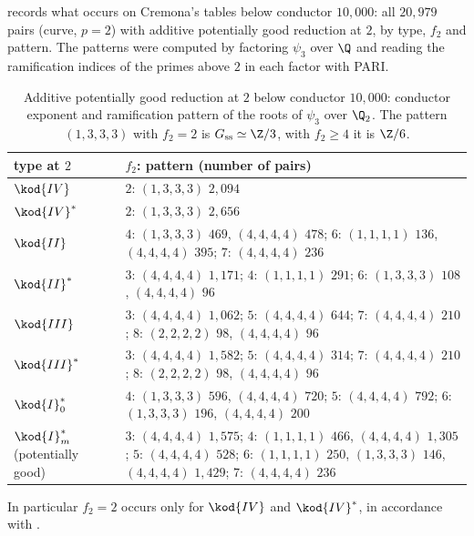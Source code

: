  records what occurs on Cremona's tables below conductor $10{,}000$: all $20{,}979$ pairs (curve, $p=2$)
with additive potentially good reduction at $2$, by type, $f_2$ and pattern. The patterns were computed by factoring $\psi_3$ over
$\Q$ and reading the ramification indices of the primes above $2$ in each factor with PARI.

\begin{table}[ht]
\centering\small
\begin{tabular}{lp{11cm}}
\toprule
type at $2$ & $f_2$: pattern (number of pairs)\\
\midrule
$\kod{IV}$ & $2$: $(1,3,3,3)$ $2{,}094$\\
$\kod{IV}^*$ & $2$: $(1,3,3,3)$ $2{,}656$\\
$\kod{II}$ & $4$: $(1,3,3,3)$ $469$, $(4,4,4,4)$ $478$; $6$: $(1,1,1,1)$ $136$, $(4,4,4,4)$ $395$; $7$: $(4,4,4,4)$ $236$\\
$\kod{II}^*$ & $3$: $(4,4,4,4)$ $1{,}171$; $4$: $(1,1,1,1)$ $291$; $6$: $(1,3,3,3)$ $108$, $(4,4,4,4)$ $96$\\
$\kod{III}$ & $3$: $(4,4,4,4)$ $1{,}062$; $5$: $(4,4,4,4)$ $644$; $7$: $(4,4,4,4)$ $210$; $8$: $(2,2,2,2)$ $98$, $(4,4,4,4)$ $96$\\
$\kod{III}^*$ & $3$: $(4,4,4,4)$ $1{,}582$; $5$: $(4,4,4,4)$ $314$; $7$: $(4,4,4,4)$ $210$; $8$: $(2,2,2,2)$ $98$, $(4,4,4,4)$ $96$\\
$\kod{I}_0^*$ & $4$: $(1,3,3,3)$ $596$, $(4,4,4,4)$ $720$; $5$: $(4,4,4,4)$ $792$; $6$: $(1,3,3,3)$ $196$, $(4,4,4,4)$ $200$\\
$\kod{I}_m^*$ (potentially good) & $3$: $(4,4,4,4)$ $1{,}575$; $4$: $(1,1,1,1)$ $466$, $(4,4,4,4)$ $1{,}305$; $5$: $(4,4,4,4)$ $528$; $6$: $(1,1,1,1)$ $250$,
$(1,3,3,3)$ $146$, $(4,4,4,4)$ $1{,}429$; $7$: $(4,4,4,4)$ $236$\\
\bottomrule
\end{tabular}
\caption{Additive potentially good reduction at $2$ below conductor $10{,}000$: conductor exponent and ramification pattern of the
roots of $\psi_3$ over $\Q_2$. The pattern $(1,3,3,3)$ with $f_2=2$ is $G_{\mathrm{ss}}\simeq\Z/3$, with $f_2\ge4$ it is $\Z/6$.}
\label{tab:reduction:inertia2}
\end{table}

In particular $f_2=2$ occurs only for $\kod{IV}$ and $\kod{IV}^*$, in accordance with .

